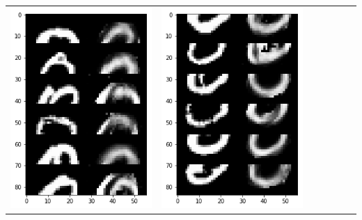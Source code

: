 \documentclass[12pt]{report} %
\begin{document}
\begin{tabular}{m{0.7cm}m{2.4cm}m{2.4cm}m{2.4cm}m{2.4cm}m{2.4cm}m{2.4cm}}
\includegraphics[scale=0.3]{pictures/M1_0_up.png} & \includegraphics[scale=0.3]{pictures/M1_0_down.png} &

\end{tabular}
\end{document}

